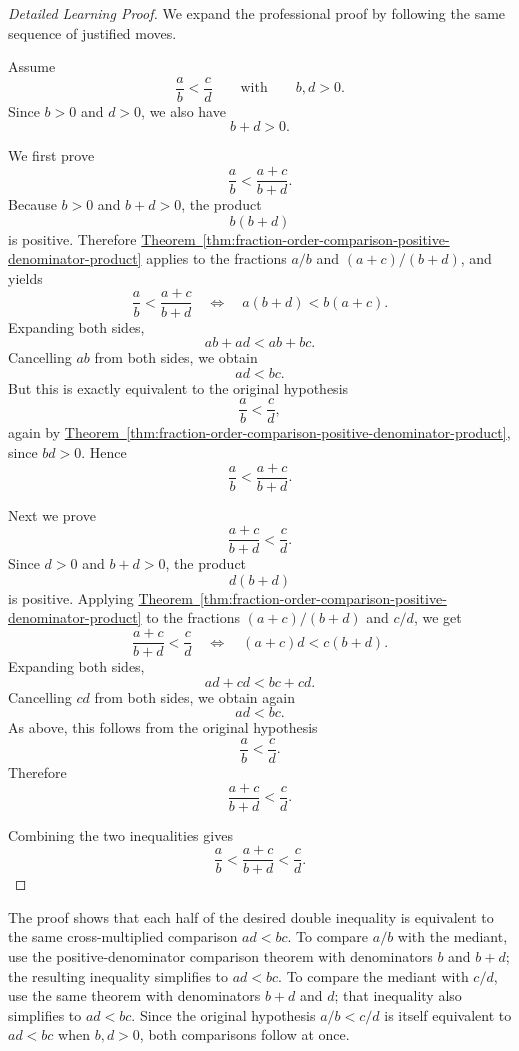 \begin{proof}[Detailed Learning Proof]
\LRAProofBodyStart
We expand the professional proof by following the same sequence of justified moves.

Assume
\[
\frac{a}{b}<\frac{c}{d}
\qquad\text{with}\qquad
b,d>0.
\]
Since $b>0$ and $d>0$, we also have
\[
b+d>0.
\]

We first prove
\[
\frac{a}{b}<\frac{a+c}{b+d}.
\]
Because $b>0$ and $b+d>0$, the product
\[
b(b+d)
\]
is positive.  Therefore
\hyperref[thm:fraction-order-comparison-positive-denominator-product]{Theorem~\ref*{thm:fraction-order-comparison-positive-denominator-product}}
applies to the fractions $a/b$ and $(a+c)/(b+d)$, and yields
\[
\frac{a}{b}<\frac{a+c}{b+d}
\quad\Longleftrightarrow\quad
a(b+d)<b(a+c).
\]
Expanding both sides,
\[
ab+ad<ab+bc.
\]
Cancelling $ab$ from both sides, we obtain
\[
ad<bc.
\]
But this is exactly equivalent to the original hypothesis
\[
\frac{a}{b}<\frac{c}{d},
\]
again by
\hyperref[thm:fraction-order-comparison-positive-denominator-product]{Theorem~\ref*{thm:fraction-order-comparison-positive-denominator-product}},
since $bd>0$.  Hence
\[
\frac{a}{b}<\frac{a+c}{b+d}.
\]

Next we prove
\[
\frac{a+c}{b+d}<\frac{c}{d}.
\]
Since $d>0$ and $b+d>0$, the product
\[
d(b+d)
\]
is positive.  Applying
\hyperref[thm:fraction-order-comparison-positive-denominator-product]{Theorem~\ref*{thm:fraction-order-comparison-positive-denominator-product}}
to the fractions $(a+c)/(b+d)$ and $c/d$, we get
\[
\frac{a+c}{b+d}<\frac{c}{d}
\quad\Longleftrightarrow\quad
(a+c)d<c(b+d).
\]
Expanding both sides,
\[
ad+cd<bc+cd.
\]
Cancelling $cd$ from both sides, we obtain again
\[
ad<bc.
\]
As above, this follows from the original hypothesis
\[
\frac{a}{b}<\frac{c}{d}.
\]
Therefore
\[
\frac{a+c}{b+d}<\frac{c}{d}.
\]

Combining the two inequalities gives
\[
\frac{a}{b}<\frac{a+c}{b+d}<\frac{c}{d}.
\]
\end{proof}

\begin{remark*}
The proof shows that each half of the desired double inequality is equivalent
to the same cross-multiplied comparison $ad<bc$.  To compare $a/b$ with the
mediant, use the positive-denominator comparison theorem with denominators
$b$ and $b+d$; the resulting inequality simplifies to $ad<bc$.  To compare
the mediant with $c/d$, use the same theorem with denominators $b+d$ and $d$;
that inequality also simplifies to $ad<bc$.  Since the original hypothesis
$a/b<c/d$ is itself equivalent to $ad<bc$ when $b,d>0$, both comparisons
follow at once.
\end{remark*}

